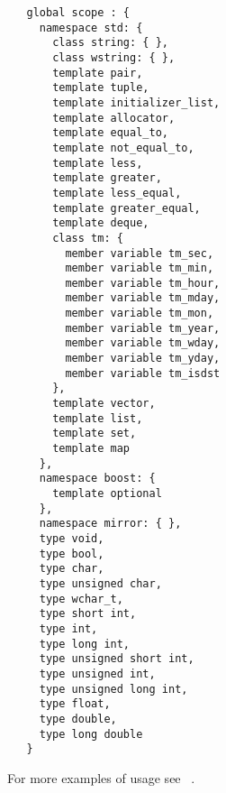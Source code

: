 \begin{verbatim}
   global scope : {
     namespace std: {
       class string: { },
       class wstring: { },
       template pair,
       template tuple,
       template initializer_list,
       template allocator,
       template equal_to,
       template not_equal_to,
       template less,
       template greater,
       template less_equal,
       template greater_equal,
       template deque,
       class tm: {
         member variable tm_sec,
         member variable tm_min,
         member variable tm_hour,
         member variable tm_mday,
         member variable tm_mon,
         member variable tm_year,
         member variable tm_wday,
         member variable tm_yday,
         member variable tm_isdst
       },
       template vector,
       template list,
       template set,
       template map
     },
     namespace boost: {
       template optional
     },
     namespace mirror: { },
     type void,
     type bool,
     type char,
     type unsigned char,
     type wchar_t,
     type short int,
     type int,
     type long int,
     type unsigned short int,
     type unsigned int,
     type unsigned long int,
     type float,
     type double,
     type long double
   }
\end{verbatim}

For more examples of usage see ~\cite{mirror-doc-puddle-examples}.
